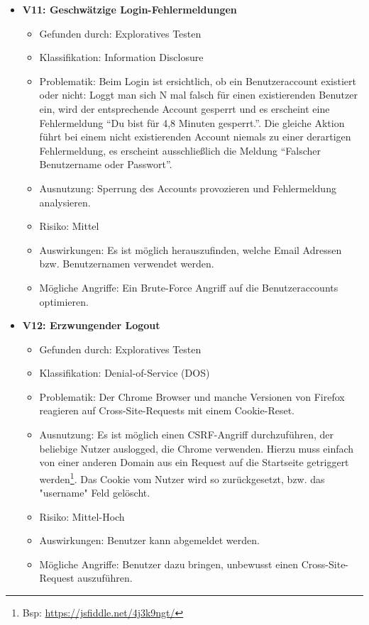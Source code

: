 \documentclass[12pt,DIV14,BCOR10mm,a4paper,parskip=half-,headsepline,headinclude,english,ngerman,bibliography=totocnumbered]{scrreprt}
\begin{document}
\begin{itemize}
  \hypertarget{vulnerability11}{}
  \item \textbf{V11: Geschwätzige Login-Fehlermeldungen}
  \begin{itemize}
  \item Gefunden durch: Exploratives Testen
  \item Klassifikation: Information Disclosure
  \item Problematik: Beim Login ist ersichtlich, ob ein Benutzeraccount existiert oder nicht: Loggt man sich N mal falsch für einen existierenden Benutzer ein, wird der entsprechende Account gesperrt und es erscheint eine Fehlermeldung \enquote{Du bist für 4,8 Minuten gesperrt.}. Die gleiche Aktion führt bei einem nicht existierenden Account niemals zu einer derartigen Fehlermeldung, es erscheint ausschließlich die Meldung \enquote{Falscher Benutzername oder Passwort}.
  \item Ausnutzung: Sperrung des Accounts provozieren und Fehlermeldung analysieren. 
  \item Risiko: Mittel
  \item Auswirkungen: Es ist möglich herauszufinden, welche Email Adressen bzw. Benutzernamen verwendet werden.
  \item Mögliche Angriffe: Ein Brute-Force Angriff auf die Benutzeraccounts optimieren.
  \end{itemize}

  \hypertarget{vulnerability12}{}
  \item \textbf{V12: Erzwungender Logout}
  \begin{itemize}
  \item Gefunden durch: Exploratives Testen
  \item Klassifikation: Denial-of-Service (DOS)
  \item Problematik: Der Chrome Browser und manche Versionen von Firefox reagieren auf Cross-Site-Requests mit einem Cookie-Reset. 
  \item Ausnutzung: Es ist möglich einen CSRF-Angriff durchzuführen, der beliebige Nutzer auslogged, die Chrome verwenden. Hierzu muss einfach von einer anderen Domain aus ein Request auf die Startseite getriggert werden\footnote{Bsp: \url{https://jsfiddle.net/4j3k9ngt/}}. Das Cookie vom Nutzer wird so zurückgesetzt, bzw. das "username" Feld gelöscht.
  \item Risiko: Mittel-Hoch
  \item Auswirkungen: Benutzer kann abgemeldet werden.
  \item Mögliche Angriffe: Benutzer dazu bringen, unbewusst einen Cross-Site-Request auszuführen.
  \end{itemize}


\end{itemize}
\end{document}
